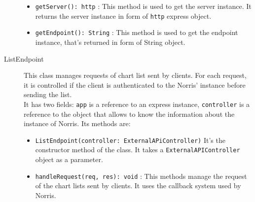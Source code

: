 \begin{description}
\begin{itemize}
			\item \texttt{getServer(): http} : This method is used to get the server instance. It returns the server instance in form of \texttt{http} express object.
			\item \texttt{getEndpoint(): String} : This method is used to get the endpoint instance, that's returned in form of String object.
		\end{itemize} 
	\item[ListEndpoint] This class manages requests of chart list sent by clients. For each request, it is controlled if the client is authenticated to the Norris' instance before sending the list.\\It has two fields: \texttt{app} is a reference to an express instance, \texttt{controller} is a reference to the object that allows to know the information about the instance of Norris. Its methods are:
	\begin{itemize}
		\item \texttt{ListEndpoint(controller: ExternalAPiController)} It's the constructor method of the class. It takes a \texttt{ExternalAPIController} object as a parameter.
		\item \texttt{handleRequest(req, res): void} : This methods manage the request of the chart lists sent by clients. It uses the callback system used by Norris.
	\end{itemize}
	
\end{description}
	
 
